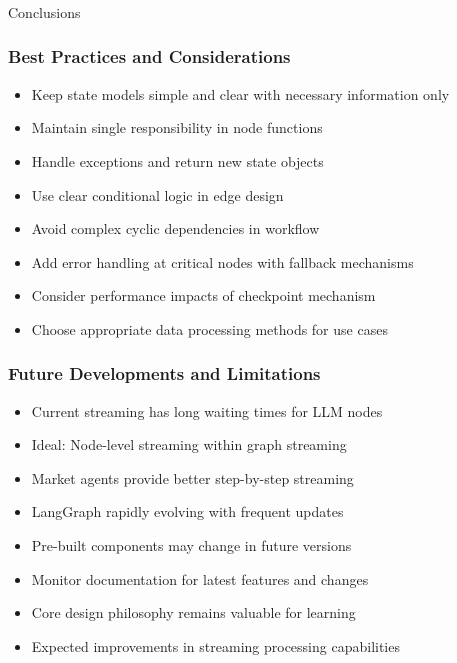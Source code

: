 \begin{frame}[fragile]\frametitle{}
\begin{center}
{\Large Conclusions}
\end{center}
\end{frame}

\begin{frame}[fragile]\frametitle{Best Practices and Considerations}
      \begin{itemize}
        \item Keep state models simple and clear with necessary information only
        \item Maintain single responsibility in node functions
        \item Handle exceptions and return new state objects
        \item Use clear conditional logic in edge design
        \item Avoid complex cyclic dependencies in workflow
        \item Add error handling at critical nodes with fallback mechanisms
        \item Consider performance impacts of checkpoint mechanism
        \item Choose appropriate data processing methods for use cases
      \end{itemize}
\end{frame}

\begin{frame}[fragile]\frametitle{Future Developments and Limitations}
      \begin{itemize}
        \item Current streaming has long waiting times for LLM nodes
        \item Ideal: Node-level streaming within graph streaming
        \item Market agents provide better step-by-step streaming
        \item LangGraph rapidly evolving with frequent updates
        \item Pre-built components may change in future versions
        \item Monitor documentation for latest features and changes
        \item Core design philosophy remains valuable for learning
        \item Expected improvements in streaming processing capabilities
      \end{itemize}
\end{frame}

